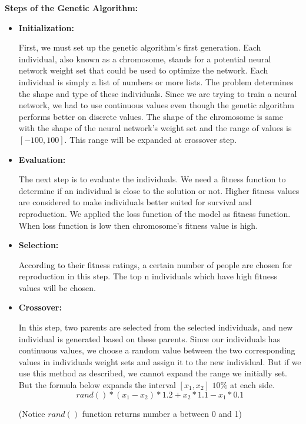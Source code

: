 \documentclass[conference]{IEEEtran}
\begin{document}
\noindent \textbf{Steps of the Genetic Algorithm:}
\begin{itemize}
    \item \textbf{Initialization:}
    
    First, we must set up the genetic algorithm's first generation. Each individual, also known as a chromosome, stands for a potential neural network weight set that could be used to optimize the network. Each individual is simply a list of numbers or more lists. The problem determines the shape and type of these individuals. Since we are trying to train a neural network, we had to use continuous values even though the genetic algorithm performs better on discrete values. The shape of the chromosome is same with the shape of the neural network's weight set and the range of values is $[-100, 100]$. This range will be expanded at crossover step.
    
    \item \textbf{Evaluation:}
    
    The next step is to evaluate the individuals. We need a fitness function to determine if an individual is close to the solution or not. Higher fitness values are considered to make individuals better suited for survival and reproduction. We applied the loss function of the model as fitness function. When loss function is low then chromosome's fitness value is high.
    
    \item \textbf{Selection:}
    
    According to their fitness ratings, a certain number of people are chosen for reproduction in this step. The top n individuals which have high fitness values will be chosen.
    
    \item \textbf{Crossover:}

    In this step, two parents are selected from the selected individuals, and new individual is generated based on these parents. Since our individuals has continuous values, we choose a random value between the two corresponding values in individuals weight sets and assign it to the new individual. But if we use this method as described, we cannot expand the range we initially set. But the formula below expands the interval $[x_1, x_2]$ $10\%$ at each side.
    $$
    rand() * (x_1 - x_2) * 1.2 + x_2 * 1.1 - x_1 * 0.1
    $$
    \begin{center}
    \footnotesize{(Notice $rand()$ function returns number a between 0 and 1)}
    \end{center}
    

\end{itemize}
\end{document}
